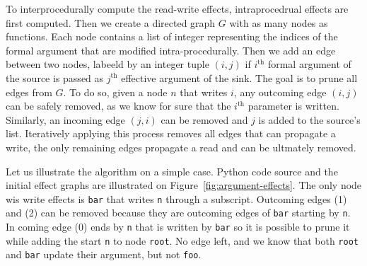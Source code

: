 \documentclass[10pt, preprint]{sigplanconf}
\begin{document}
To interprocedurally compute the read-write effects, intraprocedrual effects
are first computed. Then we create a directed graph $G$ with as many nodes as
functions. Each node contains a list of integer representing the indices of the
formal argument that are modified intra-procedurally. Then we add an edge
between two nodes, labeeld by an integer tuple $(i, j)$ if $i^\text{th}$ formal
argument of the source is passed as $j^\text{th}$ effective argument of the
sink. The goal is to prune all edges from $G$. To do so, given a node $n$ that
writes $i$, any outcoming edge $(i,j)$ can be safely removed, as we know for
sure that the $i^\text{th}$ parameter is written.  Similarly, an incoming edge
$(j,i)$ can be removed and $j$ is added to the source's list. Iteratively
applying this process removes all edges that can propagate a write, the only
remaining edges propagate a read and can be ultmately removed.

Let us illustrate the algorithm on a simple case. Python code source and the
initial effect graphs are illustrated on Figure~\ref{fig:argument-effects}. The
only node wis write effects is \texttt{bar} that writes \texttt{n} through a
subscript. Outcoming edges (1) and (2) can be removed because they are
outcoming edges of \texttt{bar} starting by \texttt{n}. In coming edge (0) ends
by \texttt{n} that is written by \texttt{bar} so it is possible to prune it
while adding the start \texttt{n} to node \texttt{root}. No edge left, and we
know that both \texttt{root} and \texttt{bar} update their argument, but not
\texttt{foo}.
\end{document}
